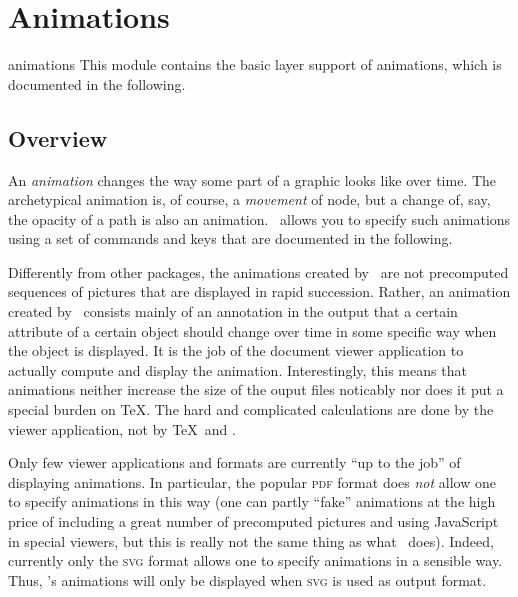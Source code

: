 %
%
%


\section{Animations}

\label{section-base-animations}

\begin{pgfmodule}{animations}
  This module contains the basic layer support of animations, which is
  documented in the following. 
\end{pgfmodule}

\subsection{Overview}

An \emph{animation} changes the way some part of a graphic looks like
over time. The archetypical animation is, of course, a \emph{movement}
of node, but a change of, say, the opacity of a path is also an
animation. \pgfname\ allows you to specify such animations using a set
of commands and keys that are documented in the following.

\begin{codeexample}[animation list={0.5,1,1.5,2}]
\end{codeexample}

Differently from other packages, the animations created by \pgfname\ are not
precomputed sequences of pictures that are displayed in rapid
succession. Rather, an animation created by \pgfname\ consists mainly
of an annotation in the output that a certain attribute of a certain
object should change over time in some specific way when the object is
displayed. It is the job of the document viewer application to
actually compute and display the animation. Interestingly, this means
that animations neither increase the size of the ouput files noticably
nor does it put a special burden on \TeX. The hard and complicated
calculations are done by the viewer application, not by \TeX\ and
\pgfname. 

Only few viewer applications and formats are currently ``up to the
job'' of displaying animations.  In particular, 
the popular \textsc{pdf} format does \emph{not} allow one to specify
animations in this way (one can partly ``fake'' animations at the
high price of including a great number of precomputed pictures and
using JavaScript in special viewers, but this is really not the same
thing as what \pgfname\ does). Indeed, currently only the  \textsc{svg}
format allows one to specify animations in a sensible way. Thus,
\pgfname's animations will only be displayed when \textsc{svg} is used
as output format.

